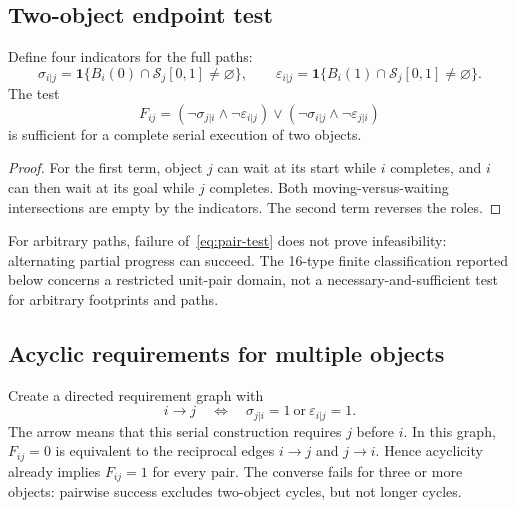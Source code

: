 \documentclass[11pt,a4paper]{article}
\theoremstyle{remark}
\newcommand{\Sw}{\mathcal S}
\begin{document}
\subsection{Two-object endpoint test}
Define four indicators for the full paths:
\begin{equation}
 \sigma_{i|j}=\mathbf1\{B_i(0)\cap\Sw_j[0,1]\ne\varnothing\},\qquad
 \varepsilon_{i|j}=\mathbf1\{B_i(1)\cap\Sw_j[0,1]\ne\varnothing\}.
 \label{eq:flags}
\end{equation}
The test
\begin{equation}
 F_{ij}=(\neg\sigma_{j|i}\land\neg\varepsilon_{i|j})
       \lor(\neg\sigma_{i|j}\land\neg\varepsilon_{j|i})
 \label{eq:pair-test}
\end{equation}
is sufficient for a complete serial execution of two objects.
\begin{proof}
For the first term, object $j$ can wait at its start while $i$ completes,
and $i$ can then wait at its goal while $j$ completes. Both moving-versus-waiting
intersections are empty by the indicators. The second term reverses the roles.
\end{proof}

For arbitrary paths, failure of~\eqref{eq:pair-test} does not prove
infeasibility: alternating partial progress can succeed. The 16-type finite
classification reported below concerns a restricted unit-pair domain,
not a necessary-and-sufficient test for arbitrary footprints and paths.

\subsection{Acyclic requirements for multiple objects}
Create a directed requirement graph with
\begin{equation}
 i\longrightarrow j\quad\Longleftrightarrow\quad
 \sigma_{j|i}=1\ \text{or}\ \varepsilon_{i|j}=1.
 \label{eq:precedence}
\end{equation}
The arrow means that this serial construction requires $j$ before $i$.
In this graph, $F_{ij}=0$ is equivalent to the reciprocal edges
$i\to j$ and $j\to i$. Hence acyclicity already implies $F_{ij}=1$ for
every pair. The converse fails for three or more objects: pairwise success
excludes two-object cycles, but not longer cycles.
\end{document}
